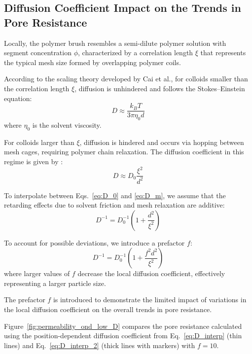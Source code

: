 \documentclass[10pt, a4paper]{article}
\begin{document}
\subsection*{Diffusion Coefficient Impact on the Trends in Pore Resistance}
\begin{multicols}{2}
    
Locally, the polymer brush resembles a semi-dilute polymer solution with segment concentration $\phi$, characterized by a correlation length $\xi$ that represents the typical mesh size formed by overlapping polymer coils.

According to the scaling theory developed by Cai et al.\cite{Cai2011}, for colloids smaller than the correlation length $\xi$, diffusion is unhindered and follows the Stokes--Einstein equation:
\begin{equation}
D \approx \frac{k_B T}{3 \pi \eta_0 d}
\label{eq:D_0}
\end{equation}
where $\eta_0$ is the solvent viscosity.

For colloids larger than $\xi$, diffusion is hindered and occurs via hopping between mesh cages, requiring polymer chain relaxation. The diffusion coefficient in this regime is given by \cite{Cai2011}:
\begin{equation}
D \approx D_0 \frac{\xi^2}{d^2}
\label{eq:D_m}
\end{equation}

To interpolate between Eqs.~\ref{eq:D_0} and \ref{eq:D_m}, we assume that the retarding effects due to solvent friction and mesh relaxation are additive:
\begin{equation}
D^{-1} = D_0^{-1} \left( 1 + \frac{d^2}{\xi^2} \right)
\label{eq:D_interp}
\end{equation}

To account for possible deviations, we introduce a prefactor $f$:
\begin{equation}
D^{-1} = D_0^{-1} \left( 1 + \frac{f^2 d^2}{\xi^2} \right)
\label{eq:D_interp_2}
\end{equation}
where larger values of $f$ decrease the local diffusion coefficient, effectively representing a larger particle size.

The prefactor $f$ is introduced to demonstrate the limited impact of variations in the local diffusion coefficient on the overall trends in pore resistance.

Figure~\ref{fig:permeability_ond_low_D} compares the pore resistance calculated using the position-dependent diffusion coefficient from Eq.~\ref{eq:D_interp} (thin lines) and Eq.~\ref{eq:D_interp_2} (thick lines with markers) with $f = 10$.


\end{multicols}
\end{document}
